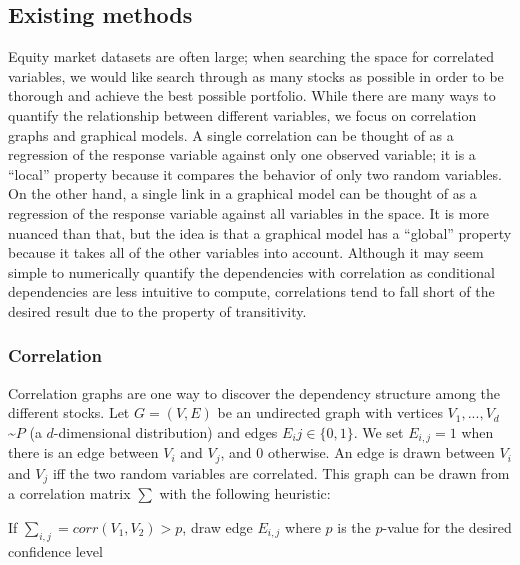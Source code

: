 \subsection{Existing methods}
\label{sec:intro:numerical:existingmethods}

Equity market datasets are often large; when searching the space for correlated variables, we would like search through as many stocks as possible in order to be thorough and achieve the best possible portfolio. While there are many ways to quantify the relationship between different variables, we focus on correlation graphs and graphical models. A single correlation can be thought of as a regression of the response variable against only one observed variable; it is a ``local'' property because it compares the behavior of only two random variables. On the other hand, a single link in a graphical model can be thought of as a regression of the response variable against all variables in the space. It is more nuanced than that, but the idea is that a graphical model has a “global” property because it takes all of the other variables into account. Although it may seem simple to numerically quantify the dependencies with correlation as conditional dependencies are less intuitive to compute, correlations tend to fall short of the desired result due to the property of transitivity.

\subsubsection{Correlation}

Correlation graphs are one way to discover the dependency structure among the different stocks. Let $G=(V,E)$ be an undirected graph with vertices $V_{1},...,V_{d}$ \textasciitilde $P$ (a $d$-dimensional distribution) and edges $E_ij\in\{0,1\}$. We set $E_{i,j}=1$ when there is an edge between $V_i$ and $V_j$, and 0 otherwise. An edge is drawn between $V_i$ and $V_j$ iff the two random variables are correlated. This graph can be drawn from a correlation matrix $\sum$ with the following heuristic:\\

\begin{algorithm}
	If $\sum_{i,j}=corr(V_1,V_2)>p$, draw edge $E_{i,j}$ where $p$ is the $p$-value for the desired confidence level
\end{algorithm}

